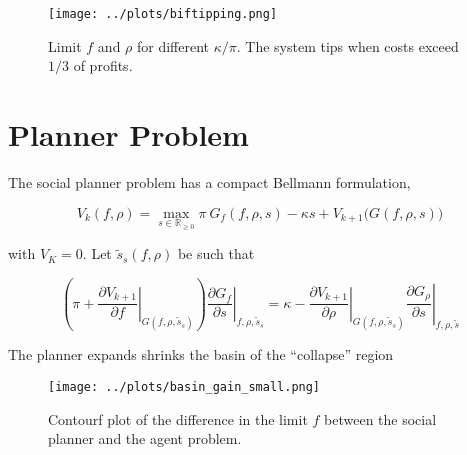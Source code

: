 \documentclass[american, abstract=on]{scrartcl}
\theoremstyle{plain}
\renewcommand{\Re}{\mathbb{R}}
\begin{document}
\begin{figure}[H]
    \centering
    \texttt{[image: ../plots/biftipping.png]}
    \caption{Limit $f$ and $\rho$ for different $\kappa / \pi$. The system tips when costs exceed $1 / 3$ of profits.}
    \label{fig:firm_bifurcation}
\end{figure}

\section{Planner Problem}


\iffalse
\begin{figure}[H]
    \centering
    \begin{subfigure}{.5\textwidth}
        \centering
        \texttt{[image: ../plots/basin\_small.png]}
        \caption{Basin plot}
        \label{fig:firm:basin}  
    \end{subfigure}%
    \begin{subfigure}{.5\textwidth}
        \centering
        \texttt{[image: ../plots/biftipping.png]}     
        \caption{Bifurcation diagram}
        \label{fig:firm:bif}
    \end{subfigure}
    \caption{Firm Dynamical System}
    \label{fig:firm}
\end{figure}
\fi

The social planner problem has a compact Bellmann formulation,

\begin{equation}
    V_k(f, \rho) = \max_{s \in \Re_{\geq 0}} \pi \ G_f(f, \rho, s) - \kappa s + V_{k + 1}\big(G(f, \rho, s)\big)
\end{equation}

with $V_K = 0$. Let $\tilde{s}_s(f, \rho)$ be such that

\begin{equation}
    \left(\pi  + \left.\frac{\partial V_{k + 1}}{\partial f}\right\vert_{G(f, \rho, \tilde{s}_s)} \right) \left.\frac{\partial G_f}{\partial s}\right\vert_{f, \rho, \tilde{s}_s} = \kappa - \left.\frac{\partial V_{k + 1}}{\partial \rho}\right\vert_{G(f, \rho, \tilde{s}_s)} \left.\frac{\partial G_\rho}{\partial s}\right\vert_{f, \rho, \tilde{s}}
\end{equation}

The planner expands shrinks the basin of the ``collapse'' region

\begin{figure}[H]
    \centering
    \texttt{[image: ../plots/basin\_gain\_small.png]}
    \caption{Contourf plot of the difference in the limit $f$ between the social planner and the agent problem.}
    \label{fig:planner_gain}
\end{figure}

\newpage
\printbibliography
\end{document}
